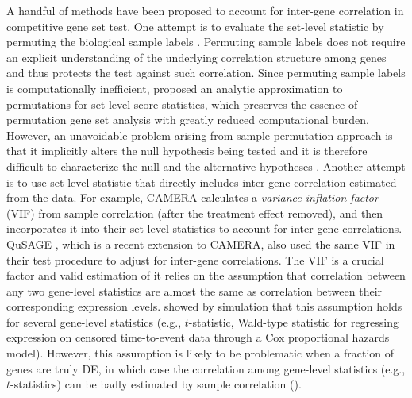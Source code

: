 	A handful of methods have been proposed to account for inter-gene correlation in competitive 
	gene
	set test. One attempt is to evaluate the set-level statistic by permuting the biological sample
	labels \citep{efron2007testing,subramanian2005gene}. Permuting sample labels
	does not require an explicit understanding of the underlying correlation structure among genes 
	and
	thus protects the test against such correlation. Since permuting sample labels is 
	computationally
	inefficient, \citet{zhou2013empirical} proposed an analytic approximation to permutations for
	set-level score statistics, which preserves the essence of permutation gene set analysis with
	greatly reduced computational burden. However, an unavoidable problem arising from sample
	permutation approach is that it implicitly alters the null hypothesis being tested and it is
	therefore difficult to characterize the null and the alternative hypotheses
	\citep{goeman2007analyzing, khatri2012ten, wu2012camera}. Another attempt is to use set-level
	statistic that directly includes inter-gene correlation estimated from the data. For example, 
	CAMERA
	\citep{wu2012camera} calculates a \textit{variance inflation factor} (VIF) from sample 
	correlation
	(after the treatment effect removed), and then incorporates it into their set-level statistics 
	to
	account for inter-gene correlations. QuSAGE \citep{yaari2013quantitative}, which is a recent
	extension to CAMERA, also used the same VIF in their test procedure to adjust for 
	inter-gene correlations. The VIF is a crucial factor and valid estimation of it
	relies on the assumption that correlation between any two gene-level statistics are almost the 
	same as
	correlation between their corresponding expression levels. \citet{barry2008statistical} showed 
	by simulation
	that this assumption holds for several gene-level statistics
	(e.g., $t$-statistic, Wald-type statistic for regressing expression on censored time-to-event 
	data
	through a Cox proportional hazards model). However, this assumption is likely to be problematic 
	when a fraction of genes are 
	truly DE, in which case the correlation among gene-level
	statistics (e.g., $t$-statistics) can be badly estimated by sample correlation 
	(\thepapertobefinished). 
	
	
	

